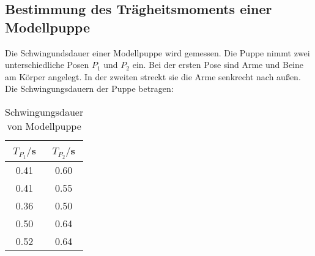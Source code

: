 \subsection{Bestimmung des Trägheitsmoments einer Modellpuppe}
Die Schwingundsdauer einer Modellpuppe wird gemessen. Die Puppe nimmt zwei unterschiedliche
Posen $P_1$ und $P_2$ ein. Bei der ersten Pose sind Arme und Beine am Körper angelegt. In der zweiten
streckt sie die Arme senkrecht nach außen. Die Schwingungsdauern der Puppe betragen:
\begin{table}
  \centering
  \caption{Schwingungsdauer von Modellpuppe}
  \label{tab:Schwingungsdauer von Modellpuppe}
  \begin{tabular}{c c}
    \toprule
    $T_{P_1}/$s & $T_{P_2}/$s \\
    \midrule
    0.41 & 0.60 \\
    0.41 & 0.55 \\
    0.36 & 0.50 \\
    0.50 & 0.64 \\
    0.52 & 0.64 \\
    \bottomrule
  \end{tabular}
\end{table}
